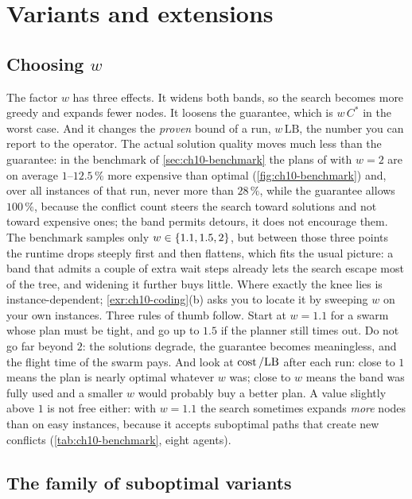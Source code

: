 \section{Variants and extensions}
\label{sec:ch10-variants}

\subsection{Choosing $w$}
\label{sec:ch10-choosing-w}

The factor $w$ has three effects. It widens both bands, so the search
becomes more greedy and expands fewer nodes. It loosens the guarantee, which
is $w\,C^*$ in the worst case. And it changes the \emph{proven} bound of a
run, $w\,\mathrm{LB}$, the number you can report to the operator. The actual
solution quality moves much less than the guarantee: in
the benchmark of \cref{sec:ch10-benchmark} the plans of \ecbs with $w = 2$ are
on average $1$--$12.5\,\%$ more expensive than optimal
(\cref{fig:ch10-benchmark}) and, over all instances of that run, never more
than $28\,\%$, while
the guarantee allows $100\,\%$, because the conflict count steers the search
toward solutions and not toward expensive ones; the band permits detours,
it does not encourage them. The benchmark samples only $w \in \left\{ 1.1, 1.5, 2 \right\}$, but between those three
points the runtime drops steeply first and then flattens, which fits the usual
picture: a band that admits a couple of extra wait steps already lets the
search escape most of the \cbs tree, and widening it further buys little.
Where exactly the knee lies is instance-dependent; \cref{exr:ch10-coding}(b)
asks you to locate it by sweeping $w$ on your own instances.
Three rules of thumb follow. Start at $w = 1.1$ for a swarm whose plan must
be tight, and go up to $1.5$ if the planner still times out. Do not go far
beyond $2$: the solutions degrade, the guarantee becomes meaningless, and the
flight time of the swarm pays. And look at $\operatorname{cost}/\mathrm{LB}$ after each
run: close to $1$ means the plan is nearly optimal whatever $w$ was; close to
$w$ means the band was fully used and a smaller $w$ would probably buy a
better plan. A value slightly above $1$ is not free either: with $w = 1.1$
the search sometimes expands \emph{more} nodes than \cbs on easy instances,
because it accepts suboptimal paths that create new conflicts
(\cref{tab:ch10-benchmark}, eight agents).

\subsection{The family of suboptimal \cbs variants}
\label{sec:ch10-family}

